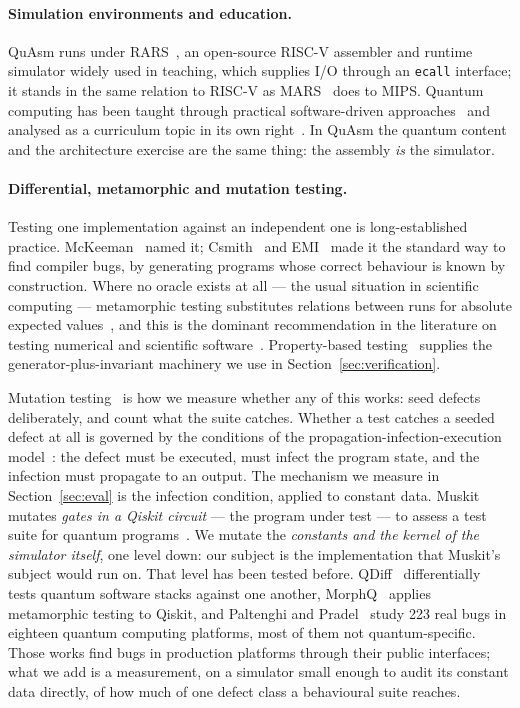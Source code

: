 \documentclass[11pt]{article}
\newcommand{\quasm}{QuAsm}
\begin{document}
\paragraph{Simulation environments and education.} \quasm{} runs under
RARS~\cite{rars}, an open-source RISC-V assembler and runtime simulator widely used in
teaching, which supplies I/O through an \texttt{ecall} interface; it stands in the same
relation to RISC-V as MARS~\cite{mars} does to MIPS. Quantum computing has been taught
through practical software-driven approaches~\cite{mykhailova2020} and analysed as a
curriculum topic in its own right~\cite{seegerer2021}. In \quasm{} the quantum content and
the architecture exercise are the same thing: the assembly \emph{is} the simulator.

\paragraph{Differential, metamorphic and mutation testing.} Testing one implementation
against an independent one is long-established practice. McKeeman~\cite{mckeeman1998} named
it; Csmith~\cite{csmith} and EMI~\cite{emi} made it the standard way to find compiler bugs,
by generating programs whose correct behaviour is known by construction. Where no oracle
exists at all --- the usual situation in scientific computing --- metamorphic testing
substitutes relations between runs for absolute expected
values~\cite{chen2018metamorphic,segura2016survey}, and this is the dominant recommendation
in the literature on testing numerical and scientific
software~\cite{hook2009,kanewala2014}. Property-based testing~\cite{quickcheck} supplies the
generator-plus-invariant machinery we use in Section~\ref{sec:verification}.

Mutation testing~\cite{demillo1978,jia2011} is how we measure whether any of this works:
seed defects deliberately, and count what the suite catches. Whether a test catches a
seeded defect at all is governed by the conditions of the propagation-infection-execution
model~\cite{voas1992pie}: the defect must be executed, must infect the program state, and the
infection must propagate to an output. The mechanism we measure in Section~\ref{sec:eval}
is the infection condition, applied to constant data. Muskit~\cite{muskit} mutates
\emph{gates in a Qiskit circuit} --- the program under test --- to assess a test suite for
quantum programs~\cite{miranskyy2020,ali2021coverage}. We mutate the \emph{constants and the
kernel of the simulator itself}, one level down: our subject is the implementation that
Muskit's subject would run on. That level has been tested before. QDiff~\cite{qdiff}
differentially tests quantum software stacks against one another, MorphQ~\cite{morphq}
applies metamorphic testing to Qiskit, and Paltenghi and Pradel~\cite{paltenghi2022bugs}
study 223 real bugs in eighteen quantum computing platforms, most of them not
quantum-specific. Those works find bugs in production platforms through their public
interfaces; what we add is a measurement, on a simulator small enough to audit its constant
data directly, of how much of one defect class a behavioural suite reaches.
\end{document}

